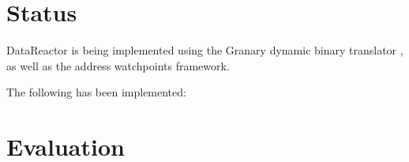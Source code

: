 \documentclass{sig-alternate}
\newcommand{\Toolname}{DataReactor}
\begin{document}
\section{Status}\label{sec:status}
\Toolname{} is being implemented using the Granary dynamic binary translator \cite{Granary}, as well as the address watchpoints
\cite{AddressWatchpoints} framework.

The following has been implemented:

\section{Evaluation}\label{sec:evaluation}




\end{document}
